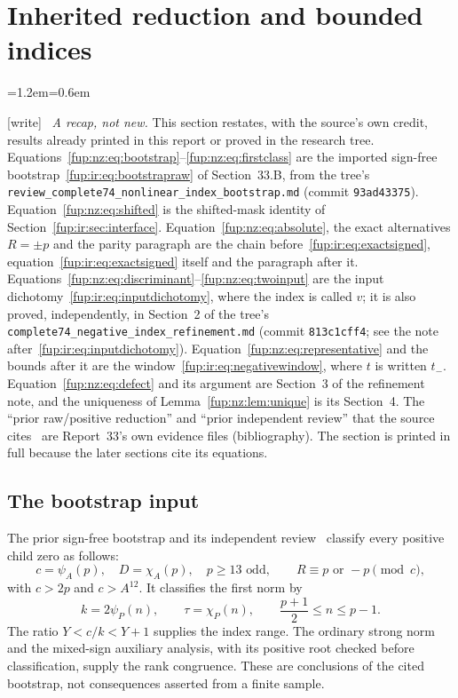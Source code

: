 \documentclass[11pt,letterpaper]{article}
\theoremstyle{definition}\newtheorem{definition}[theorem]{Definition}
\theoremstyle{remark}\newtheorem{remark}[theorem]{Remark}
\newcommand{\wtag}{\textup{[write]}}
\newenvironment{writenote}{\par\smallskip\begin{list}{}{\leftmargin=1.2em\rightmargin=0.6em}\item[]\small\wtag\ }{\end{list}\smallskip}
\newcommand{\rw}[1]{\nolinkurl{#1}}%
\begin{document}
\section{Inherited reduction and bounded indices}\label{fup:nz:sec:prior}
\begin{writenote}
\emph{A recap, not new.} This section restates, with the source's own credit, results already printed in this report or proved in the research tree. Equations~\eqref{fup:nz:eq:bootstrap}--\eqref{fup:nz:eq:firstclass} are the imported sign-free bootstrap~\eqref{fup:ir:eq:bootstrapraw} of Section~33.B, from the tree's \rw{review_complete74_nonlinear_index_bootstrap.md} (commit \texttt{93ad43375}). Equation~\eqref{fup:nz:eq:shifted} is the shifted-mask identity of Section~\ref{fup:ir:sec:interface}. Equation~\eqref{fup:nz:eq:absolute}, the exact alternatives $R=\pm p$ and the parity paragraph are the chain before~\eqref{fup:ir:eq:exactsigned}, equation~\eqref{fup:ir:eq:exactsigned} itself and the paragraph after it. Equations~\eqref{fup:nz:eq:discriminant}--\eqref{fup:nz:eq:twoinput} are the input dichotomy~\eqref{fup:ir:eq:inputdichotomy}, where the index is called $v$; it is also proved, independently, in Section~2 of the tree's \rw{complete74_negative_index_refinement.md} (commit \texttt{813c1cff4}; see the note after~\eqref{fup:ir:eq:inputdichotomy}). Equation~\eqref{fup:nz:eq:representative} and the bounds after it are the window~\eqref{fup:ir:eq:negativewindow}, where $t$ is written $t_-$. Equation~\eqref{fup:nz:eq:defect} and its argument are Section~3 of the refinement note, and the uniqueness of Lemma~\ref{fup:nz:lem:unique} is its Section~4. The ``prior raw/positive reduction'' and ``prior independent review'' that the source cites~\cite{fup:nz:prior} are Report~33's own evidence files (bibliography). The section is printed in full because the later sections cite its equations.
\end{writenote}
\subsection{The bootstrap input}
The prior sign-free bootstrap and its independent review~\cite{fup:nz:bootstrap,fup:nz:prior} classify every positive child zero as follows:
\begin{equation}\label{fup:nz:eq:bootstrap}
 c=\psi_A(p),\quad D=\chi_A(p),\quad p\ge13\text{ odd},\qquad
 R\equiv p\text{ or }-p\pmod c,
\end{equation}
with $c>2p$ and $c>A^{12}$. It classifies the first norm by
\begin{equation}\label{fup:nz:eq:firstclass}
 k=2\psi_P(n),\qquad \tau=\chi_P(n),\qquad
 \frac{p+1}{2}\le n\le p-1.
\end{equation}
The ratio $Y<c/k<Y+1$ supplies the index range. The ordinary strong norm and the mixed-sign auxiliary analysis, with its positive root checked before classification, supply the rank congruence. These are conclusions of the cited bootstrap, not consequences asserted from a finite sample.
\end{document}
